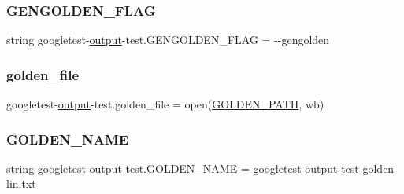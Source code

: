 \subsubsection{\texorpdfstring{GENGOLDEN\_FLAG}{GENGOLDEN\_FLAG}}
{\footnotesize\ttfamily string googletest-\/\mbox{\hyperlink{namespacegoogletest-output-test_ab3df9ce09186215a36c30454cf282417}{output}}-\/test.\+G\+E\+N\+G\+O\+L\+D\+E\+N\+\_\+\+F\+L\+AG = \textquotesingle{}-\/-\/gengolden\textquotesingle{}}

\mbox{\label{namespacegoogletest-output-test_a1f278fb4e124e36b91d94699d921b1c4}} 
\subsubsection{\texorpdfstring{golden\_file}{golden\_file}}
{\footnotesize\ttfamily googletest-\/\mbox{\hyperlink{namespacegoogletest-output-test_ab3df9ce09186215a36c30454cf282417}{output}}-\/test.\+golden\+\_\+file = open(\mbox{\hyperlink{namespacegoogletest-output-test_aaf2c3cbfc15d83d986e1e2ba99a94a3e}{G\+O\+L\+D\+E\+N\+\_\+\+P\+A\+TH}}, \textquotesingle{}wb\textquotesingle{})}

\mbox{\label{namespacegoogletest-output-test_a66b45fb215424c968b479fbf864f1e7f}} 
\subsubsection{\texorpdfstring{GOLDEN\_NAME}{GOLDEN\_NAME}}
{\footnotesize\ttfamily string googletest-\/\mbox{\hyperlink{namespacegoogletest-output-test_ab3df9ce09186215a36c30454cf282417}{output}}-\/test.\+G\+O\+L\+D\+E\+N\+\_\+\+N\+A\+ME = \textquotesingle{}googletest-\/\mbox{\hyperlink{namespacegoogletest-output-test_ab3df9ce09186215a36c30454cf282417}{output}}-\/\mbox{\hyperlink{_mutual_8h_a707ee03719e99670bf6cfdfd897b8456}{test}}-\/golden-\/lin.\+txt\textquotesingle{}}

\mbox{\label{namespacegoogletest-output-test_aaf2c3cbfc15d83d986e1e2ba99a94a3e}} 
